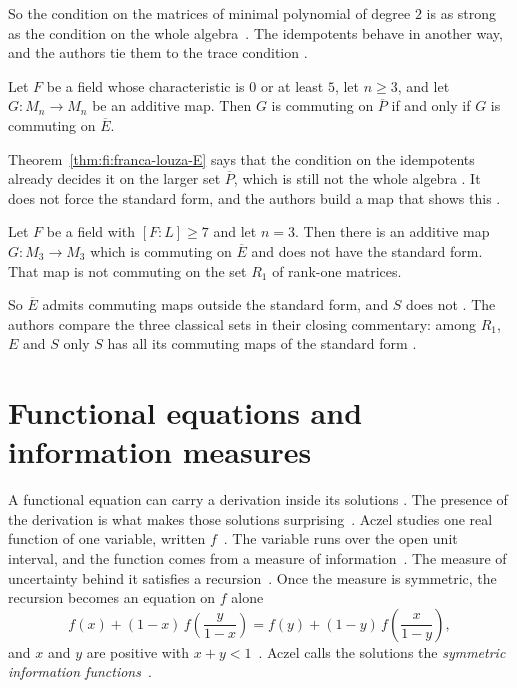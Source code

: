 So the condition on the matrices of minimal polynomial of degree $2$ is as
strong as the condition on the whole algebra~\cite[p.~2547]{FrancaLouza2024}. The idempotents behave in
another way, and the authors tie them to the trace condition
\cite[p.~2547]{FrancaLouza2024}.

\begin{theorem}\label{thm:fi:franca-louza-E}
Let $F$ be a field whose characteristic is $0$ or at least $5$, let $n\ge3$, and let
$G\colon M_n\to M_n$ be an additive map. Then $G$ is commuting on $\overline{P}$ if
and only if $G$ is commuting on $\overline{E}$.
\end{theorem}

Theorem~\ref{thm:fi:franca-louza-E} says that the condition on the idempotents
already decides it on the larger set $\overline{P}$, which is still not the
whole algebra \cite[p.~2547]{FrancaLouza2024}. It does not force the standard
form, and the authors build a map that shows this \cite[Example~7.1,
pp.~2550--2553]{FrancaLouza2024}.

\begin{example}\label{ex:fi:franca-louza}
Let $F$ be a field with $[F:L]\ge7$ and let $n=3$. Then there is an additive map
$G\colon M_3\to M_3$ which is commuting on $\overline{E}$ and does not have the
standard form. That map is not commuting on the set $R_1$ of rank-one matrices.
\end{example}

So $\overline{E}$ admits commuting maps outside the standard form, and $S$
does not \cite[p.~2553]{FrancaLouza2024}. The authors compare the three
classical sets in their closing commentary: among $R_1$, $E$ and $S$ only $S$
has all its commuting maps of the standard form
\cite[p.~2553]{FrancaLouza2024}.

\section{Functional equations and information measures}\label{sec:functional-identities:information-functions}

A functional equation can carry a derivation inside its solutions
\cite[p.~195]{Aczel1981}. The presence of the derivation is what makes those
solutions surprising~\cite[p.~195]{Aczel1981}. Aczel studies one real function
of one variable, written $f$~\cite[p.~191]{Aczel1981}. The variable runs over
the open unit interval, and the function comes from a measure of
information~\cite[p.~191]{Aczel1981}. The measure of uncertainty behind it
satisfies a recursion~\cite[pp.~192--193]{Aczel1981}. Once the measure is
symmetric, the recursion becomes an equation on $f$ alone
\[
  f(x) + (1-x)\,f\!\left(\frac{y}{1-x}\right)
  = f(y) + (1-y)\,f\!\left(\frac{x}{1-y}\right),
\]
and $x$ and $y$ are positive with $x + y < 1$~\cite[pp.~192--193]{Aczel1981}.
Aczel calls the solutions the \emph{symmetric information
functions}~\cite[p.~192]{Aczel1981}.

